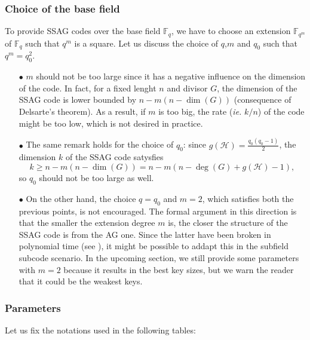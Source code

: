 \documentclass[10pt]{article}
\theoremstyle{definition}
\theoremstyle{definition}
\theoremstyle{definition}
\newcommand{\calH}{\mathcal{H}}
\newcommand{\Fqm}{\mathbb{F}_{q^m}}
\newcommand{\Fq}{\mathbb{F}_q}
\begin{document}
\subsubsection{Choice of the base field}


To provide SSAG codes over the base field $\Fq$, we have to choose an extension $\Fqm$ of $\Fq$ such that $q^m$ is a square. Let us discuss the choice of $q$,$m$ and $q_0$ such that $q^m=q_0^2$.

\begin{enumerate}
\item[$\bullet$] $m$ should not be too large since it has a negative influence on the dimension of the code. In fact, for a fixed lenght $n$ and divisor $G$, the dimension of the SSAG code is lower bounded by $n-m(n-\dim(G))$ (consequence of Delsarte's theorem). As a result, if $m$ is too big, the rate (\textit{ie.} $k/n$) of the code might be too low, which is not desired in practice.
\item[$\bullet$] The same remark holds for the choice of $q_0$: since $g(\calH)=\frac{q_0(q_0-1)}{2}$, the dimension $k$ of the SSAG code satysfies 
\[k \geq n-m(n-\dim(G)) = n-m(n- \deg(G) +g(\calH)-1),\]
so $q_0$ should not be too large as well.
\item[$\bullet$] On the other hand, the choice $q=q_0$ and $m=2$, which satisfies both the previous points, is not encouraged. The formal argument in this direction is that the smaller the extension degree $m$ is, the closer the structure of the SSAG code is from the AG one. Since the latter have been broken in polynomial time (see \cite{Cou}), it might be possible to addapt this in the subfield subcode scenario. In the upcoming section, we still provide some parameters with $m=2$ because it results in the best key sizes, but we warn the reader that it could be the weakest keys. 
\end{enumerate}
 

\subsubsection{Parameters} \label{some parameters}


Let us fix the notations used in the following tables:
\end{document}
